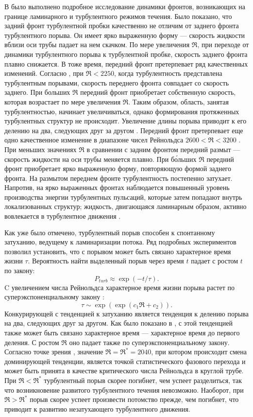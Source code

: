 В \cite{Moxey2010, Barkley2015, Song2017} было выполнено подробное исследование динамики фронтов, возникающих на границе ламинарного и турбулентного режимов течения. Было показано, что задний фронт турбулентной пробки качественно не отличим от заднего фронта турбулентного порыва. Он имеет ярко выраженную форму --- скорость жидкости вблизи оси трубы падает на нем скачком. По мере увеличения $\Re$, при переходе от динамики турбулентного порыва к турбулентной пробке, скорость заднего фронта плавно снижается. В тоже время, передний фронт претерпевает ряд качественных изменений. Согласно \cite{Moxey2010}, при $\Re < 2250$, когда турбулентность представлена турбулентным порывами, скорость переднего фронта совпадает со скорость заднего. При больших $\Re$ передний фронт приобретает собственную скорость, которая возрастает по мере увеличения $\Re$. Таким образом, область, занятая турбулентностью, начинает увеличиваться, однако формирования протяженных турбулентных структур не происходит. Увеличение длины порыва приводит к его делению на два, следующих друг за другом \cite{Moxey2010}. Передний фронт претерпевает еще одно качественное изменение в диапазоне чисел Рейнольдса $2600 < \Re < 3200$ \cite{Barkley2015}. При меньших значениях $\Re$ в сравнении с задним фронтом передний размыт --- скорость жидкости на оси трубы меняется плавно. При б\'{о}льших $\Re$ передний фронт приобретает ярко выраженную форму, повторяющую формой заднего фронта. На размытом переднем фронте турбулентность постепенно затухает. Напротив, на ярко выраженных фронтах наблюдается повышенный уровень производства энергии турбулентных пульсаций, которые затем попадают внутрь локализованных структур; жидкость, двигающаяся ламинарным образом, активно вовлекается в турбулентное движения \cite{Song2017}. 

Как уже было отмечено, турбулентный порыв способен к спонтанному затуханию, ведущему к ламинаризации потока. Ряд подробных экспериментов \cite{Hof2006finite, Willis2007, Peixinho2007} позволил установить, что с порывом может быть связано характерное время жизни $\tau$. Вероятность найти выделенный порыв через время $t$ падает с ростом $t$ по закону:
$$P_{turb} \approx \exp(-t/\tau).$$ 
C увеличением числа Рейнольдса характерное время жизни порыва растет по суперэкспоненциальному закону \cite{Hof2008, Kuik2010}:
$$\tau \sim \exp(\exp(c_1 \Re + c_2)).$$ 
Конкурирующей с тенденцией к затуханию является тенденция к делению порыва на два, следующих друг за другом. Как было показано в \cite{Avila2011}, с этой тенденцией также может быть связано характерное время --- характерное время до первого деления. С ростом $\Re$ оно падает также по суперэкспоненциальному закону. Согласно точке зрения \cite{Avila2011}, значение $\Re=\Re^*=2040$, при котором происходит смена доминирующей тенденции, является точкой статистического фазового перехода и может быть принята в качестве критического числа Рейнольдса в круглой трубе. При $\Re<\Re^*$ турбулентный порыв скорее погибнет, чем успеет разделиться, так что возникновение развитого турбулентного течения невозможно. Наоборот, при $\Re>\Re^*$ порыв скорее успеет произвести потомство прежде, чем погибнет, что приводит к развитию незатухающего турбулентного движения. 

